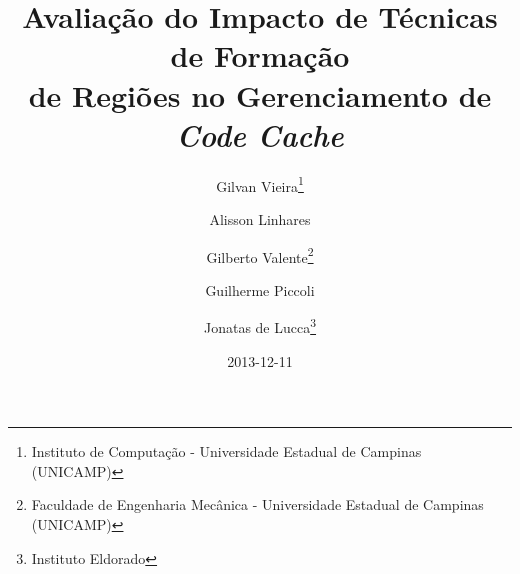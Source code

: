 \documentclass[11pt,twoside]{article}
\begin{document}
% 

%



\TRMakeCover

%
\pagestyle{myheadings}

%
\title{Avaliação do Impacto de Técnicas de Formação\\ de Regiões no Gerenciamento de \emph{Code Cache}}

\author{Gilvan Vieira\thanks{Instituto de Computação - Universidade Estadual de Campinas (UNICAMP)} \and
Alisson Linhares\footnotemark[1] \and Gilberto Valente\thanks{Faculdade de Engenharia Mecânica - Universidade Estadual de Campinas (UNICAMP)} \and Guilherme Piccoli\footnotemark[1] \and Jonatas de Lucca\thanks{Instituto Eldorado}}

\date{2013-12-11}

\maketitle



%
%  
\end{document}
